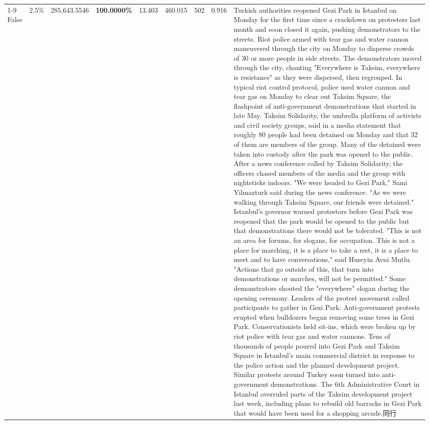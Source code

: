 \begin{table}[H]
\begin{tabular}{lllrlllll}
\cline{1-9}
False & 2.5\% & \color{red} 285,643.5546 & \bfseries \color{red} 100.0000\% & 13.403 & 460.015 & 502 & 0.916 & Turkish authorities reopened Gezi Park in Istanbul on Monday for the first time since a crackdown on protesters last month and soon closed it again, pushing demonstrators to the streets. Riot police armed with tear gas and water cannon maneuvered through the city on Monday to disperse crowds of 30 or more people in side streets. The demonstrators moved through the city, chanting "Everywhere is Taksim, everywhere is resistance" as they were dispersed, then regrouped. In typical riot control protocol, police used water cannon and tear gas on Monday to clear out Taksim Square, the flashpoint of anti-government demonstrations that started in late May. Taksim Solidarity, the umbrella platform of activists and civil society groups, said in a media statement that roughly 80 people had been detained on Monday and that 32 of them are members of the group. Many of the detained were taken into custody after the park was opened to the public. After a news conference called by Taksim Solidarity, the officers chased members of the media and the group with nightsticks indoors. "We were headed to Gezi Park," Sami Yilmazturk said during the news conference. "As we were walking through Taksim Square, our friends were detained." Istanbul's governor warned protestors before Gezi Park was reopened that the park would be opened to the public but that demonstrations there would not be tolerated. "This is not an area for forums, for slogans, for occupation. This is not a place for marching, it is a place to take a rest, it is a place to meet and to have conversations," said Huseyin Avni Mutlu. "Actions that go outside of this, that turn into demonstrations or marches, will not be permitted." Some demonstrators shouted the "everywhere" slogan during the opening ceremony. Leaders of the protest movement called participants to gather in Gezi Park. Anti-government protests erupted when bulldozers began removing some trees in Gezi Park. Conservationists held sit-ins, which were broken up by riot police with tear gas and water cannons. Tens of thousands of people poured into Gezi Park and Taksim Square in Istanbul's main commercial district in response to the police action and the planned development project. Similar protests around Turkey soon turned into anti-government demonstrations. The 6th Administrative Court in Istanbul overruled parts of the Taksim development project last week, including plans to rebuild old barracks in Gezi Park that would have been used for a shopping arcade.同行 \\

\end{tabular}
\end{table}

